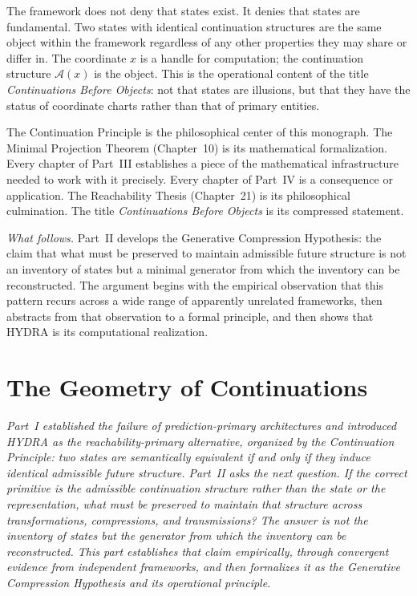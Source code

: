 \documentclass[12pt, oneside]{book}
\theoremstyle{flyxion}
\theoremstyle{definition}
\begin{document}
The framework does not deny that states exist. It denies that states
are fundamental. Two states with identical continuation structures are
the same object within the framework regardless of any other
properties they may share or differ in. The coordinate $x$ is a handle
for computation; the continuation structure $\mathcal{A}(x)$ is the
object. This is the operational content of the title \emph{Continuations
Before Objects}: not that states are illusions, but that they have
the status of coordinate charts rather than that of primary entities.

The Continuation Principle is the philosophical center of this
monograph. The Minimal Projection Theorem (Chapter~10) is its
mathematical formalization. Every chapter of Part~III establishes
a piece of the mathematical infrastructure needed to work with it
precisely. Every chapter of Part~IV is a consequence or application.
The Reachability Thesis (Chapter~21) is its philosophical
culmination. The title \emph{Continuations Before Objects} is its
compressed statement.

\bigskip
\noindent\emph{What follows.} Part~II develops the Generative
Compression Hypothesis: the claim that what must be preserved to
maintain admissible future structure is not an inventory of states
but a minimal generator from which the inventory can be reconstructed.
The argument begins with the empirical observation that this pattern
recurs across a wide range of apparently unrelated frameworks, then
abstracts from that observation to a formal principle, and then shows
that HYDRA is its computational realization.



\part{The Geometry of Continuations}

\noindent\textit{Part~I established the failure of prediction-primary
architectures and introduced HYDRA as the reachability-primary
alternative, organized by the Continuation Principle: two states are
semantically equivalent if and only if they induce identical admissible
future structure. Part~II asks the next question. If the correct
primitive is the admissible continuation structure rather than the
state or the representation, what must be preserved to maintain that
structure across transformations, compressions, and transmissions? The
answer is not the inventory of states but the generator from which
the inventory can be reconstructed. This part establishes that claim
empirically, through convergent evidence from independent frameworks,
and then formalizes it as the Generative Compression Hypothesis and
its operational principle.}
\end{document}

